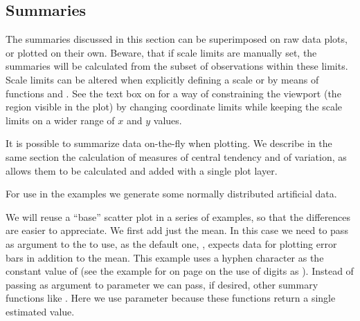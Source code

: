 \documentclass[krantz2]{krantz}\usepackage{knitr}%
\begin{document}

\subsection{Summaries}\label{sec:plot:stat:summaries}
The summaries discussed in this section can be superimposed on raw data plots, or plotted on their own. Beware, that if scale limits are manually set, the summaries will be calculated from the subset of observations within these limits. Scale limits can be altered when explicitly defining a scale or by means of functions  and . See the text box on \pageref{box:plot:coord:lims} for a way of constraining the viewport (the region visible in the plot) by changing coordinate limits while keeping the scale limits on a wider range of $x$ and $y$ values.

It is possible to summarize data on-the-fly when plotting. We describe in the same section the calculation of measures of central tendency and of variation, as  allows them to be calculated and added with a single plot layer.

For use in the examples we generate some normally distributed artificial data.

\begin{knitrout}\footnotesize
{}\color{fgcolor}\begin{kframe}
\begin{alltt}
 \hlkwb{<-} \hlstd{(}
   \hlstd{=} \hlstd{(}\hlstd{(}\hlstd{,}  \hlstd{=} \hlstd{,}  \hlstd{=} \hlstd{),}
        \hlstd{(}\hlstd{,}  \hlstd{=} \hlstd{,}  \hlstd{=} \hlstd{)),}
   \hlstd{=} \hlstd{(}\hlstd{(}\hlstd{(}\hlstd{,} \hlstd{),} \hlstd{(}\hlstd{,} \hlstd{)))}
  \hlstd{)}
\end{alltt}
\end{kframe}
\end{knitrout}

We will reuse a ``base'' scatter plot in a series of examples, so that the differences are easier to appreciate. We first add just the mean. In this case we need to pass as argument to  the  to use, as the default one, , expects data for plotting error bars in addition to the mean. This example uses a hyphen character as the constant value of  (see the example for  on page \pageref{chunk:plot:point:char} on the use of digits as ). Instead of passing  as argument to parameter  we can pass, if desired, other summary functions like . Here we use parameter  because these functions return a single estimated value.
\end{document}
